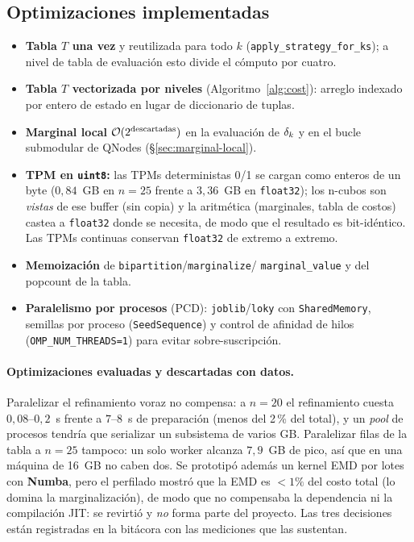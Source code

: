 \documentclass[11pt,letterpaper]{article}
\begin{document}
\subsection{Optimizaciones implementadas}
\begin{itemize}
	\item \textbf{Tabla $T$ una vez} y reutilizada para todo $k$
	      (\texttt{apply\_strategy\_for\_ks}); a nivel de tabla de evaluación esto divide
	      el cómputo por cuatro.
	\item \textbf{Tabla $T$ vectorizada por niveles} (Algoritmo~\ref{alg:cost}):
	      arreglo indexado por entero de estado en lugar de diccionario de tuplas.
	\item \textbf{Marginal local} $\mathcal{O}(2^{\text{descartadas}})$ en la evaluación
	      de $\delta_k$ y en el bucle submodular de QNodes (§\ref{sec:marginal-local}).
	\item \textbf{TPM en \texttt{uint8}:} las TPMs deterministas 0/1 se cargan como
	      enteros de un byte ($0{,}84$~GB en $n=25$ frente a $3{,}36$~GB en
	      \texttt{float32}); los n-cubos son \emph{vistas} de ese buffer (sin copia) y la
	      aritmética (marginales, tabla de costos) castea a \texttt{float32} donde se
	      necesita, de modo que el resultado es bit-idéntico. Las TPMs continuas conservan
	      \texttt{float32} de extremo a extremo.
	\item \textbf{Memoización} de \texttt{bipartition}/\texttt{marginalize}/
	      \texttt{marginal\_value} y del popcount de la tabla.
	\item \textbf{Paralelismo por procesos} (PCD): \texttt{joblib}/\texttt{loky} con
	      \texttt{SharedMemory}, semillas por proceso (\texttt{SeedSequence}) y control de
	      afinidad de hilos (\texttt{OMP\_NUM\_THREADS=1}) para evitar sobre-suscripción.
\end{itemize}

\paragraph{Optimizaciones evaluadas y descartadas con datos.} Paralelizar el
refinamiento voraz no compensa: a $n=20$ el refinamiento cuesta $0{,}08$--$0{,}2$~s
frente a $7$--$8$~s de preparación (menos del 2\,\% del total), y un \emph{pool}
de procesos tendría que serializar un subsistema de varios GB. Paralelizar filas
de la tabla a $n=25$ tampoco: un solo worker alcanza $7{,}9$~GB de pico, así que
en una máquina de 16~GB no caben dos. Se prototipó además un kernel EMD por lotes
con \textbf{Numba}, pero el perfilado mostró que la EMD es $<1\%$ del costo total (lo
domina la marginalización), de modo que no compensaba la dependencia ni la compilación
JIT: se revirtió y \emph{no} forma parte del proyecto. Las tres decisiones están
registradas en la bitácora con las mediciones que las sustentan.
\end{document}
